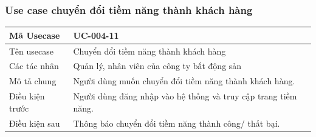 \documentclass[12pt,a4paper]{article}
\begin{document}
    \subsubsection*{Use case chuyển đổi tiềm năng thành khách hàng}
    \begin{table}[H]
        \centering
        \begin{tabular}{|p{3.5cm}|p{11.5cm}|c|}
            \hline
            Mã Usecase      & UC-004-11                                                      \\
            \hline
            Tên usecase     & Chuyển đổi tiềm năng thành khách hàng                          \\
            \hline
            Các tác nhân    & Quản lý, nhân viên của công ty bất động sản                    \\
            \hline
            Mô tả chung     & Người dùng muốn chuyển đổi tiềm năng thành khách hàng.         \\
            \hline

            Điều kiện trước & Người dùng đăng nhập vào hệ thống và truy cập trang tiềm năng. \\
            \hline

            Điều kiện sau   & Thông báo chuyển đổi tiềm năng thành công/ thất bại.           \\
            \hline


\end{tabular}
\end{table}
\end{document}
